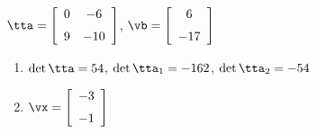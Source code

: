 {$\tta = \left[ \begin {array}{cc} 0&-6\\\noalign{\medskip}9&-10\end {array}
 \right]$,
 \quad
$\vb = \left[ \begin {array}{c} 6\\\noalign{\medskip}-17\end {array}
 \right]$}
{\begin{enumerate}
\item	$\det{\tta} = 54$, $\det{\tta_1} = -162$, $\det{\tta_2} = -54$
\item $\vx = \left[ \begin {array}{c} -3\\\noalign{\medskip}-1\end {array}
 \right]$
 \end{enumerate}
}
 
